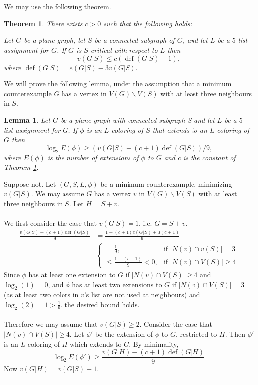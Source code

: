 \documentclass[letterpaper,12pt,oneside,onecolumn]{article}
\newenvironment{proof}{{\bf Proof:  }}{\hfill\rule{2mm}{2mm}}
\newtheorem{lemma}[fact]{Lemma}
\newtheorem{theorem}[fact]{Theorem}
\DeclareMathOperator{\defi}{def}
\begin{document}
\section{}
We may use the following theorem.
\begin{theorem}\label{th:def}
	There exists $c>0$ such that the following holds:
	
	Let $G$ be a plane graph, let $S$ be a connected subgraph of $G$, and let $L$ be a $5$-list-assignment for $G$. If $G$ is $S$-critical with respect to $L$ then
	$$v(G|S) \leq c(\defi(G|S) - 1),$$
	where $\defi(G|S) = e(G|S) - 3v(G|S).$
\end{theorem}
We will prove the following lemma, under the assumption that a minimum counterexample $G$ has a vertex in $V(G)\backslash V(S)$ with at least three neighbours in $S$.
\begin{lemma}
	Let $G$ be a plane graph with connected subgraph $S$ and let $L$ be a $5$-list-assignment for $G$. If $\phi$ is an $L$-coloring of $S$ that extends to an $L$-coloring of $G$ then
	$$\log_2 E(\phi) \geq (v(G|S) - (c+1)\defi(G|S))/9,$$
	where $E(\phi)$ is the number of extensions of $\phi$ to $G$ and $c$ is the constant of Theorem \ref{th:def}.
\end{lemma}
\begin{proof}
	Suppose not. Let $(G,S,L, \phi)$ be a minimum counterexample, minimizing $v(G|S)$. We may assume $G$ has a vertex $v$ in $V(G)\backslash V(S)$ with at least three neighbours in $S$. Let $H = S+v$. 
	\paragraph{}
	We first consider the case that $v(G|S) = 1$, i.e. $G = S + v$.
	\begin{align*}
	\frac{v(G|S) - (c+1)\defi(G|S)}{9} &= \frac{1 - (c+1)e(G|S) +3(c+1)}{9} \\
	&\begin{cases}
		=\frac{1}{9}, &\text{if $|N(v)\cap v(S)| = 3$}  \\
		\leq\frac{1-(c+1)}{9} <0, &\text{if $|N(v) \cap V(S)| \geq 4$}	\end{cases}
	\end{align*}
	Since $\phi$ has at least one extension to $G$ if $|N(v) \cap V(S)| \geq 4$ and $\log_2(1) = 0$, and $\phi$ has at least two extensions to $G$ if $|N(v) \cap V(S)| = 3$ (as at least two colors in $v$'s list are not used at neighbours) and $\log_2(2) = 1 > \frac{1}{9}$, the desired bound holds.
	\paragraph{}
	Therefore we may assume that $v(G|S) \geq 2$. Consider the case that $|N(v) \cap V(S)| \geq 4$. Let $\phi'$ be the extension of $\phi$ to $G$, restricted to $H$. Then $\phi'$ is an $L$-coloring of $H$ which extends to $G$. By minimality, 
	$$\log_2 E(\phi') \geq \frac{v(G|H) - (c+1)\defi(G|H)}{9}$$
	Now $v(G|H) = v(G|S) - 1$.
\end{proof}
\end{document}
